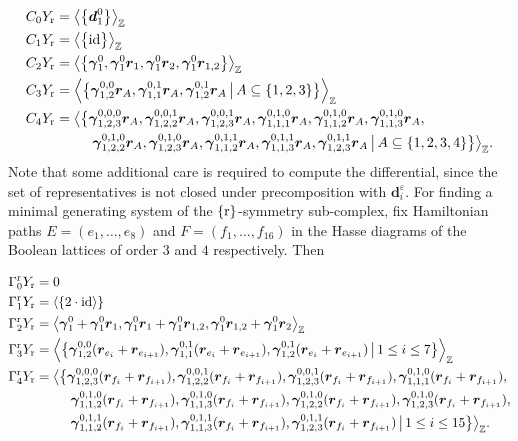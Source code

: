 \documentclass[12pt]{amsart}
\theoremstyle{plain}
\numberwithin{lemma}{\DefaultNumberTheoremWithin}
\numberwithin{claim}{\DefaultNumberTheoremWithin}
\numberwithin{theorem}{\DefaultNumberTheoremWithin}
\numberwithin{corollary}{\DefaultNumberTheoremWithin}
\numberwithin{proposition}{\DefaultNumberTheoremWithin}
\numberwithin{conjecture}{\DefaultNumberTheoremWithin}
\theoremstyle{definition}
\theoremstyle{definition}
\numberwithin{question}{\DefaultNumberTheoremWithin}
\theoremstyle{definition}
\numberwithin{problem}{\DefaultNumberTheoremWithin}
\theoremstyle{remark}
\numberwithin{remark}{\DefaultNumberTheoremWithin}
\theoremstyle{remark}
\numberwithin{example}{\DefaultNumberTheoremWithin}
\def\ve{\varepsilon}
\def\id{\textnormal{id}}
\def\rev{\textnormal{r}}
\def\bd{\boldsymbol d}
\def\br{\boldsymbol r}
\def\bg{\boldsymbol\gamma}
\def\Con{\mathrm{\Gamma}}  %
\def\rCon{\Con^{\rev}}   %
\begin{document}
\begin{align*}
    C_0 Y_\rev &=\left\langle\big\{\bd_1^0 \big\}\right \rangle_\mathbb{Z} \\
    C_1 Y_\rev &=\left\langle\big\{\id \big\}\right \rangle_\mathbb{Z} \\
    C_2 Y_\rev &=\left\langle\big\{ \bg_1^0,\bg_1^0\br_1,\bg_1^0\br_2,\bg_1^0\br_{1,2}\big\}\right \rangle_\mathbb{Z} \\
    C_3 Y_\rev &=\left\langle\big\{ \bg_{1,2}^{0,0}\br_A,\bg_{1,1}^{0,1}\br_A,\bg_{1,2}^{0,1}\br_A\,\big\vert\, A\subseteq \{1,2,3\}\big\}\right \rangle_\mathbb{Z} \\
    C_4 Y_\rev &=\big\langle\big\{\bg_{1,2,3}^{0,0,0}\br_A,
    \bg_{1,2,2}^{0,0,1}\br_A,\bg_{1,2,3}^{0,0,1}\br_A,
    \bg_{1,1,1}^{0,1,0}\br_A,\bg_{1,1,2}^{0,1,0}\br_A,
    \bg_{1,1,3}^{0,1,0}\br_A,\\&\qquad~~\bg_{1,2,2}^{0,1,0}\br_A,\bg_{1,2,3}^{0,1,0}\br_A,
    \bg_{1,1,2}^{0,1,1}\br_A,\bg_{1,1,3}^{0,1,1}\br_A,\bg_{1,2,3}^{0,1,1}\br_A
    \,\big\vert\, A\subseteq \{1,2,3,4\}\big\}\big\rangle_\mathbb{Z}.
\end{align*}
Note that some additional care is required to compute the differential, since the set of representatives is not closed under precomposition with $\bd_i^\ve$.
For finding a minimal generating system of the $\{\rev\}$-symmetry sub-complex, fix Hamiltonian paths $E=(e_1,\dots ,e_8)$ and $F=(f_1,\dots ,f_{16})$ in the Hasse diagrams of the Boolean lattices of order $3$ and $4$ respectively. Then

\begin{align*}
    \rCon_0Y_\rev&=0\\
    \rCon_1Y_\rev&=\left\langle\{2\cdot \id\right\rangle\}\\
    \rCon_2Y_\rev&=\left\langle \bg_1^0+\bg_1^0\br_1,\bg_1^0\br_1 + \bg_1^0\br_{1,2} ,\bg_1^0\br_{1,2}+\bg_1^0\br_2 \right\rangle_\mathbb{Z}\\
    \rCon_3Y_\rev&=\left\langle\big\{ \bg_{1,2}^{0,0}(\br_{e_i}+\br_{e_{i+1}}),\bg_{1,1}^{0,1}(\br_{e_i}+\br_{e_{i+1}}),\bg_{1,2}^{0,1}(\br_{e_i}+\br_{e_{i+1}})\,\big\vert\, 1\leq i \leq 7\big\}\right \rangle_\mathbb{Z}  \\
    \rCon_4Y_\rev&=\big\langle\big\{\bg_{1,2,3}^{0,0,0}(\br_{f_i}+\br_{f_{i+1}}),
    \bg_{1,2,2}^{0,0,1}(\br_{f_i}+\br_{f_{i+1}}),\bg_{1,2,3}^{0,0,1}(\br_{f_i}+\br_{f_{i+1}}),
    \bg_{1,1,1}^{0,1,0}(\br_{f_i}+\br_{f_{i+1}}),\\&\qquad~~
    \bg_{1,1,2}^{0,1,0}(\br_{f_i}+\br_{f_{i+1}}),\bg_{1,1,3}^{0,1,0}(\br_{f_i}+\br_{f_{i+1}}),\bg_{1,2,2}^{0,1,0}(\br_{f_i}+\br_{f_{i+1}}),\bg_{1,2,3}^{0,1,0}(\br_{f_i}+\br_{f_{i+1}}),\\&\qquad~~
    \bg_{1,1,2}^{0,1,1}(\br_{f_i}+\br_{f_{i+1}}),\bg_{1,1,3}^{0,1,1}(\br_{f_i}+\br_{f_{i+1}}),\bg_{1,2,3}^{0,1,1}(\br_{f_i}+\br_{f_{i+1}}) \,\big\vert\, 1\leq i \leq 15\big\}\big\rangle_\mathbb{Z}.
\end{align*}
\end{document}
